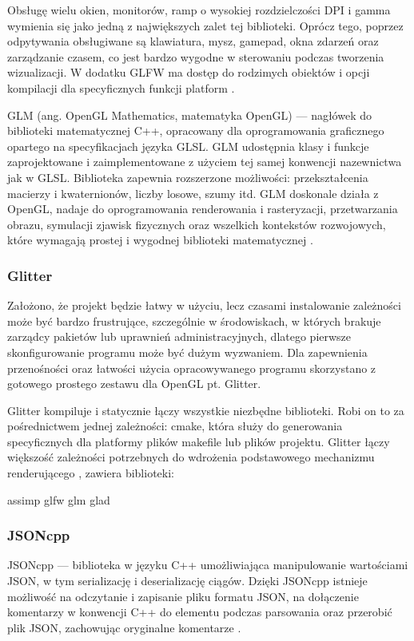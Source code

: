 Obsługę wielu okien, monitorów, ramp o wysokiej rozdzielczości DPI i gamma wymienia się jako jedną z największych zalet tej biblioteki. Oprócz tego, poprzez odpytywania obsługiwane są klawiatura, mysz, gamepad, okna zdarzeń oraz zarządzanie czasem, co jest bardzo wygodne w sterowaniu podczas tworzenia wizualizacji. W dodatku GLFW ma dostęp do rodzimych obiektów i opcji kompilacji dla specyficznych funkcji platform \cite{glfw}.

GLM (ang. OpenGL Mathematics, matematyka OpenGL) --- nagłówek do biblioteki matematycznej C++, opracowany dla oprogramowania graficznego opartego na specyfikacjach języka GLSL. GLM udostępnia klasy i funkcje zaprojektowane i zaimplementowane z użyciem tej samej konwencji nazewnictwa jak w GLSL. Biblioteka zapewnia rozszerzone możliwości: przekształcenia macierzy i kwaternionów, liczby losowe, szumy itd. GLM doskonale działa z OpenGL, nadaje do oprogramowania renderowania i rasteryzacji, przetwarzania obrazu, symulacji zjawisk fizycznych oraz wszelkich kontekstów rozwojowych, które wymagają prostej i wygodnej biblioteki matematycznej \cite{glm}.

\subsubsection{Glitter}
Założono, że projekt będzie łatwy w użyciu, lecz czasami instalowanie zależności może być bardzo frustrujące, szczególnie w środowiskach, w których brakuje zarządcy pakietów lub uprawnień administracyjnych, dlatego pierwsze skonfigurowanie programu może być dużym wyzwaniem. Dla zapewnienia przenośności oraz łatwości użycia opracowywanego programu skorzystano z gotowego prostego zestawu dla OpenGL pt. Glitter.

Glitter kompiluje i statycznie łączy wszystkie niezbędne biblioteki. Robi on to za pośrednictwem jednej zależności: cmake, która służy do generowania specyficznych dla platformy plików makefile lub plików projektu. Glitter łączy większość zależności potrzebnych do wdrożenia podstawowego mechanizmu renderującego \cite{glitter}, zawiera biblioteki:
\begin{itemize}
\itemi assimp
\itemi glfw
\itemi glm
\itemi glad
\end{itemize}

\subsubsection{JSONcpp}
JSONcpp --- biblioteka w języku C++ umożliwiająca manipulowanie wartościami JSON, w tym serializację i deserializację ciągów. Dzięki JSONcpp istnieje możliwość na odczytanie i zapisanie pliku formatu JSON, na dołączenie komentarzy w konwencji C++ do elementu podczas parsowania oraz przerobić plik JSON, zachowując oryginalne komentarze \cite{jsoncpp}.

